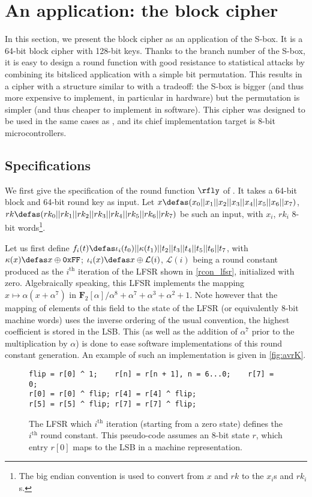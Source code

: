 \section{An application: the \littlunpride block cipher}
\label{sec:fly}

In this section, we present the \fly block cipher as an application of the \littlunOne S-box. It is a 64-bit
block cipher with 128-bit keys.
Thanks to the branch
number of the S-box, it is easy to design a round function with good resistance to statistical attacks by combining
its bitsliced application with a simple bit permutation. This results in a cipher with a structure similar to \present \cite{present}
with a tradeoff: the S-box is bigger (and thus more expensive to implement, in particular in hardware) but the
permutation is simpler (and thus cheaper to implement in software).
This cipher was designed to be used in the same cases as \pride, and its chief implementation target is 8-bit microcontrollers.

\subsection{Specifications}

We first give the specification of the round function $\rfly$ of \fly. It takes a 64-bit block and 64-bit round key as input.
Let $x \defas (x_0||x_1||x_2||x_3||x_4||x_5||x_6||x_7)$, $rk \defas (rk_0||rk_1||rk_2||rk_3||rk_4||rk_5||rk_6|| rk_7)$ be such
an input, with $x_i$, $rk_i$ 8-bit words\footnote{The big endian convention is used to convert from $x$ and $rk$ to the $x_i$s and $rk_i$s.}.

Let us first define $f_i(t) \defas \iota_i(t_0)||\kappa(t_1)||t_2||t_3||t_4||t_5||t_6||t_7$, with $\kappa(x) \defas x \oplus \texttt{0xFF}$;
$\iota_i(x) \defas x \oplus \mathcal{L}(i)$,
$\mathcal{L}(i)$ being a round constant produced as the $i^\text{th}$ iteration of the LFSR shown in
\autoref{rcon_lfsr}, initialized with zero. Algebraically speaking, this LFSR implements the mapping $x \mapsto \alpha(x + \alpha^7)$
in $\mathbf{F}_2[\alpha]/\alpha^8+\alpha^7+\alpha^3+\alpha^2+1$. Note however that the mapping of elements of this field to the state of the
LFSR (or equivalently 8-bit machine words) uses the inverse ordering of the usual convention, \ie{} the highest coefficient is
stored in the LSB. This (as well as the addition of $\alpha^7$ prior to the multiplication by $\alpha$) is done to ease software implementations
of this round constant generation. An example of such an implementation is given in 
\autoref{fig:avrK}.
\begin{figure}[ht]
\begin{verbatim}
flip = r[0] ^ 1;    r[n] = r[n + 1], n = 6...0;    r[7] = 0;
r[0] = r[0] ^ flip; r[4] = r[4] ^ flip;
r[5] = r[5] ^ flip; r[7] = r[7] ^ flip;
\end{verbatim}
\caption[The round-constant-generating LFSR.]{The LFSR which $i^\text{th}$ iteration (starting from a zero state) defines the $i^\text{th}$ round constant. This pseudo-code
assumes an 8-bit state $r$, which entry $r[0]$ maps to the LSB in a machine representation\label{rcon_lfsr}.}
\end{figure}

